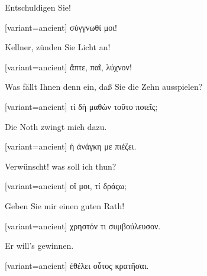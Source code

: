 Ent\textcompwordmark{}schuldigen Sie!

\switchcolumn

\begin{greek}[variant=ancient]%
σύγγνωθί μοι!

\end{greek}%
\switchcolumn*

Kellner, zünden Sie Licht an!

\switchcolumn

\begin{greek}[variant=ancient]%
ἅπτε, παῖ, λύχνον!

\end{greek}%
\switchcolumn*

Was fällt Ihnen denn ein, daß Sie die Zehn aus\textcompwordmark{}spielen? 

\switchcolumn

\begin{greek}[variant=ancient]%
τί δὴ μαθὼν τοῦτο ποιεῖς;

\end{greek}%
\switchcolumn*

Die Noth zwingt mich dazu.

\switchcolumn

\begin{greek}[variant=ancient]%
ἡ ἀνάγκη με πιέζει.

\end{greek}%
\switchcolumn*

Verwünscht! was soll ich thun?

\switchcolumn

\begin{greek}[variant=ancient]%
οἴ μοι, τί δράςω;

\end{greek}%
\switchcolumn*

Geben Sie mir einen guten Rath!

\switchcolumn

\begin{greek}[variant=ancient]%
χρηστόν τι συμβούλευσον.

\end{greek}%
\switchcolumn*

Er will's gewinnen.

\switchcolumn

\begin{greek}[variant=ancient]%
ἐθέλει οὗτος κρατῆσαι.

\end{greek}%
\switchcolumn*

